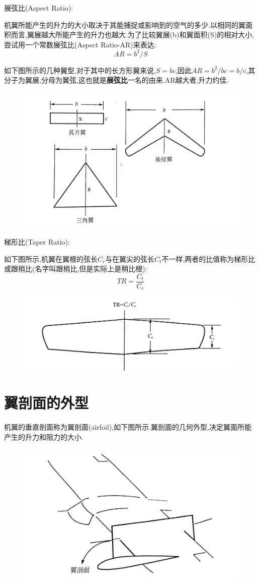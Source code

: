 \documentclass[9pt, oneside]{book}
\begin{document}
展弦比(Aspect Ratio):

机翼所能产生的升力的大小取决于其能捕捉或影响到的空气的多少.以相同的翼面积而言,翼展越大所能产生的升力也越大.为了比较翼展(b)和翼面积(S)的相对大小,尝试用一个常数展弦比(Aspect Ratio-AR)来表达:
\begin{equation}
    AR = b^2/S
\end{equation}

如下图所示的几种翼型,对于其中的长方形翼来说,$S = bc$,因此$AR = b^2/bc = b/c$,其分子为翼展,分母为翼弦,这也就是\textbf{展弦比}一名的由来.AR越大者,升力约佳.
\begin{figure}[H]
    \centering
    \includegraphics[width=0.6\linewidth]{image/2-4.jpg}
\end{figure}

梯形比(Taper Ratio):

如下图所示,机翼在翼根的弦长$C_r$与在翼尖的弦长$C_t$不一样,两者的比值称为梯形比或跟梢比(名字叫跟梢比,但是实际上是稍比根):
\begin{equation}
    TR = \frac{C_t}{C_r}
\end{equation}
\begin{figure}[H]
    \centering
    \includegraphics[width=0.6\linewidth]{image/2-5.jpg}
\end{figure}

\section{翼剖面的外型}

机翼的垂直剖面称为翼剖面(airfoil),如下图所示.翼剖面的几何外型,决定翼面所能产生的升力和阻力的大小.
\begin{figure}[H]
    \centering
    \includegraphics[width=0.6\linewidth]{image/2-6.jpg}
\end{figure}
\end{document}
